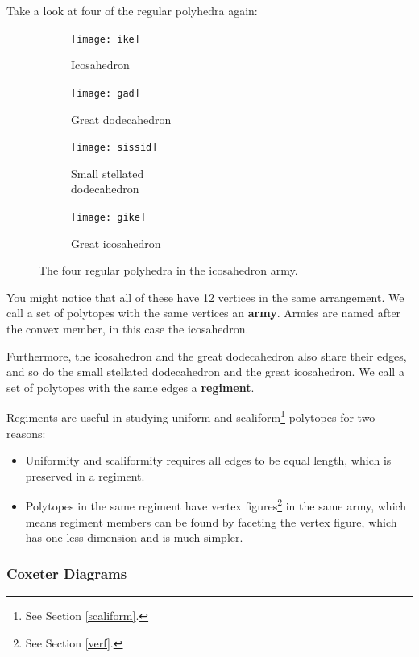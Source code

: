 \documentclass{article}
\begin{document}
Take a look at four of the regular polyhedra again:

\begin{figure}[H]
  \centering
  \begin{subfigure}{.25\textwidth}
    \centering
    \texttt{[image: ike]}
    \caption{Icosahedron}
  \end{subfigure}%
  \begin{subfigure}{.25\textwidth}
    \centering
    \texttt{[image: gad]}
    \caption{Great dodecahedron}
  \end{subfigure}%
  \begin{subfigure}{.25\textwidth}
    \centering
    \texttt{[image: sissid]}
    \caption{Small stellated\\dodecahedron}
  \end{subfigure}%
  \begin{subfigure}{.25\textwidth}
    \centering
    \texttt{[image: gike]}
    \caption{Great icosahedron}
  \end{subfigure}%
  \caption{The four regular polyhedra in the icosahedron army.}
  \label{fig:ike_army}
\end{figure}

You might notice that all of these have 12 vertices in the same arrangement. We call a set of
polytopes with the same vertices an \textbf{army}. Armies are named after the convex member, in
this case the icosahedron.

Furthermore, the icosahedron and the great dodecahedron also share their edges, and so do the
small stellated dodecahedron and the great icosahedron. We call a set of polytopes with the same
edges a \textbf{regiment}.

Regiments are useful in studying uniform and scaliform\footnote{See Section \ref{scaliform}.} 
polytopes for two reasons:
\begin{itemize}
  \item Uniformity and scaliformity requires all edges to be equal length, which is 
  preserved in a regiment.
  \item Polytopes in the same regiment have vertex figures\footnote{See Section \ref{verf}.}
  in the same army, which means regiment members can be found by faceting the vertex
  figure, which has one less dimension and is much simpler.
\end{itemize}

\subsubsection{Coxeter Diagrams}
\end{document}
